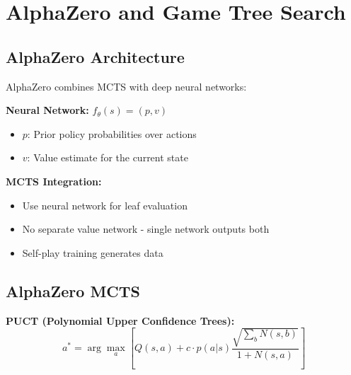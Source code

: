 \section{AlphaZero and Game Tree Search}

\subsection{AlphaZero Architecture}

AlphaZero combines MCTS with deep neural networks:

\textbf{Neural Network:} $f_\theta(s) = (p, v)$
\begin{itemize}
    \item $p$: Prior policy probabilities over actions
    \item $v$: Value estimate for the current state
\end{itemize}

\textbf{MCTS Integration:}
\begin{itemize}
    \item Use neural network for leaf evaluation
    \item No separate value network - single network outputs both
    \item Self-play training generates data
\end{itemize}

\subsection{AlphaZero MCTS}


\textbf{PUCT (Polynomial Upper Confidence Trees):}
\begin{equation}
a^* = \arg\max_a \left[ Q(s,a) + c \cdot p(a|s) \frac{\sqrt{\sum_b N(s,b)}}{1 + N(s,a)} \right]
\end{equation}


